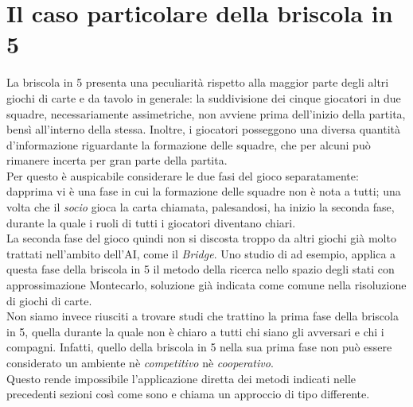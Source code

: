 \section{Il caso particolare della briscola in 5}

La briscola in 5 presenta una peculiarità rispetto alla maggior parte degli altri giochi di carte e da tavolo in generale: la suddivisione dei cinque giocatori in due squadre, necessariamente assimetriche, non avviene prima dell'inizio della partita, bensì all'interno della stessa.
Inoltre, i giocatori posseggono una diversa quantità d'informazione riguardante la formazione delle squadre, che per alcuni può rimanere incerta per gran parte della partita.\\
Per questo è auspicabile considerare le due fasi del gioco separatamente: dapprima vi è una fase in cui la formazione delle squadre non è nota a tutti; una volta che il \emph{socio} gioca la carta chiamata, palesandosi, ha inizio la seconda fase, durante la quale i ruoli di tutti i giocatori diventano chiari.\\
La seconda fase del gioco quindi non si discosta troppo da altri giochi già molto trattati nell'ambito dell'AI, come il \emph{Bridge}.
Uno studio di \cite{villa} ad esempio, applica a questa fase della briscola in 5 il metodo della ricerca nello spazio degli stati con approssimazione Montecarlo, soluzione già indicata come comune nella risoluzione di giochi di carte.\\
Non siamo invece riusciti a trovare studi che trattino la prima fase della briscola in 5, quella durante la quale non è chiaro a tutti chi siano gli avversari e chi i compagni.
Infatti, quello della briscola in 5 nella sua prima fase non può essere considerato un ambiente nè \emph{competitivo} nè \emph{cooperativo}.\\
Questo rende impossibile l'applicazione diretta dei metodi indicati nelle precedenti sezioni così come sono e chiama un approccio di tipo differente.

